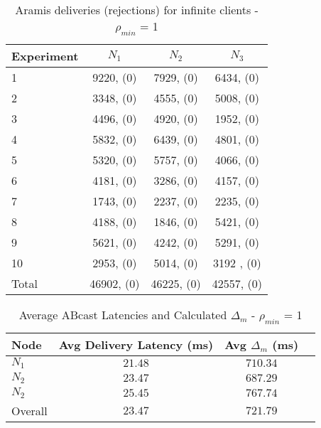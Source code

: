 \begin{table}[h]
  \begin{center}
  \renewcommand{\arraystretch}{1.3}
   \begin{tabular}{|l|c|c|c|}
    \hline
    Experiment & $N_1$   & $N_2$   & $N_3$      \\ \hline \hline
    1          & 9220, (0)  & 7929, (0)  & 6434, (0)    \\ \hline
    2          & 3348, (0)  & 4555, (0)  & 5008, (0)   \\ \hline
    3          & 4496, (0)  & 4920, (0)  & 1952, (0)  \\ \hline
    4          & 5832, (0)  & 6439, (0)  & 4801, (0)    \\ \hline
    5          & 5320, (0)  & 5757, (0)  & 4066, (0)   \\ \hline
    6          & 4181, (0)  & 3286, (0)  & 4157, (0)   \\ \hline
    7          & 1743, (0)  & 2237, (0)  & 2235, (0)   \\ \hline
    8          & 4188, (0)  & 1846, (0)  & 5421, (0)   \\ \hline
    9          & 5621, (0)  & 4242, (0)  & 5291, (0)   \\ \hline
    10        & 2953, (0)  & 5014, (0)  & 3192 , (0)   \\ \hline
    Total    &46902, (0) &46225, (0) &42557, (0) \\ \hline
    \end{tabular}
    \caption{Aramis deliveries (rejections) for infinite clients - $\rho_{min}$ = 1}
    \label{table:infinite_clients_aramis}
  \end{center}
\end{table}
    
\begin{table}[h]
  \begin{center}
  \renewcommand{\arraystretch}{1.3}
   \begin{tabular}{|l|c|c|c|}
    \hline
    Node      & Avg Delivery Latency (ms) & Avg $\Delta_m$ (ms) \\ \hline \hline
    $N_1$   & $21.48$                           & $710.34$                   \\ \hline
    $N_2$   & $23.47$                           & $687.29$                  \\ \hline
    $N_2$   & $25.45$                           & $767.74$                   \\ \hline \hline
    Overall   & $23.47$                           & $721.79$                 \\ \hline
    \end{tabular}
    \caption{Average \textsf{ABcast} Latencies and Calculated $\Delta_m$ - $\rho_{min}$ = 1}
    \label{table:infinite_clients_aramis}
  \end{center}
\end{table}       
    
